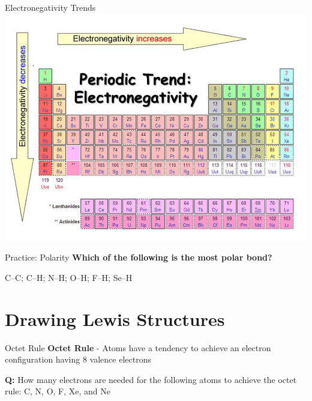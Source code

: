 \documentclass[11pt]{beamer}
\begin{document}
\begin{frame}{Electronegativity Trends}
  \centering
  \includegraphics[width=\linewidth]{electronegativity}
\end{frame}

\begin{frame}{Practice: Polarity}
  \textbf{Which of the following is the most polar bond?}

    C--C; C--H; N--H; O--H; F--H; Se--H
\end{frame}

\section{Drawing Lewis Structures}

\begin{frame}{Octet Rule}
  \textbf{Octet Rule} - Atoms have a tendency to achieve
  an electron configuration having 8 valence electrons

  \textbf{Q:} How many electrons are needed for the following
  atoms to achieve the octet rule: C, N, O, F, Xe, and Ne
\end{frame}
\end{document}
